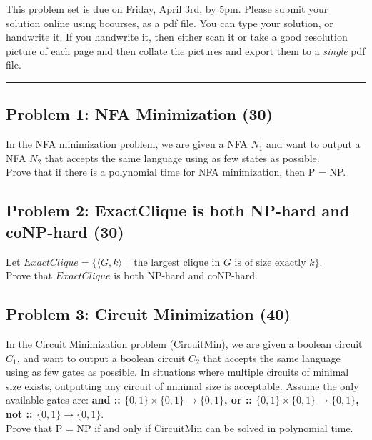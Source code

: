 \documentclass{article}
\begin{document}

This problem set is due on Friday, April 3rd, by 5pm. Please submit your solution online using bcourses,
as a pdf file. You can type your solution, or handwrite it. If you handwrite it, then either
scan it or take a good resolution picture of each page and then collate the pictures
and export them to a {\em single} pdf file.

\bigskip

\hrule

\subsection*{Problem 1: NFA Minimization (30)}
In the NFA minimization problem, we are given a NFA $N_1$ and want to output a NFA $N_2$
that accepts the same language using as few states as possible.\\

\noindent Prove that if there is a polynomial time for NFA minimization,
then P = NP.

\subsection*{Problem 2: ExactClique is both NP-hard and coNP-hard (30)}

Let $ExactClique = \{ \langle G, k \rangle \mid \text{ the largest clique in } G \text{ is of size exactly } k \}$.\\

\noindent Prove that $ExactClique$ is both NP-hard and coNP-hard.


\subsection*{Problem 3: Circuit Minimization (40)}
\noindent In the Circuit Minimization problem (CircuitMin),
we are given a boolean circuit $C_1$, and want to output a boolean circuit $C_2$
that accepts the same language using as few gates as possible.
In situations where multiple circuits of minimal size exists,
outputting any circuit of minimal size is acceptable.
Assume the only available gates are: {\bf and :: $ \{0,1\} \times \{0,1\} \rightarrow \{0,1\}$, 
or :: $ \{0,1\} \times \{0,1\} \rightarrow \{0,1\}$, not :: $ \{0,1\} \rightarrow \{0,1\}$}.\\

\noindent Prove that P = NP if and only if CircuitMin can be solved in polynomial time.\\
\end{document}
